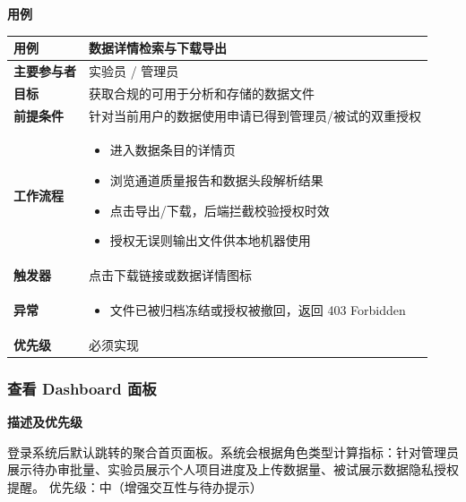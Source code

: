 \textbf{用例}
\begin{table}[H]
    \centering
    \begin{tabular}{|p{3cm}|p{11.5cm}|}
        \hline
        \textbf{用例} & 数据详情检索与下载导出 \\
        \hline
        \textbf{主要参与者} & 实验员 / 管理员 \\
        \hline
        \textbf{目标} & 获取合规的可用于分析和存储的数据文件 \\
        \hline
        \textbf{前提条件} & 针对当前用户的数据使用申请已得到管理员/被试的双重授权 \\
        \hline
        \textbf{工作流程} & 
        \vspace{-0.3cm}
        \begin{itemize}
            \item 进入数据条目的详情页
            \item 浏览通道质量报告和数据头段解析结果
            \item 点击导出/下载，后端拦截校验授权时效
            \item 授权无误则输出文件供本地机器使用
        \end{itemize} \vspace{-0.3cm} \\
        \hline
        \textbf{触发器} & 点击下载链接或数据详情图标 \\
        \hline
        \textbf{异常} &
        \vspace{-0.3cm}
        \begin{itemize}
            \item 文件已被归档冻结或授权被撤回，返回 403 Forbidden
        \end{itemize} \vspace{-0.3cm} \\
        \hline
        \textbf{优先级} & 必须实现 \\
        \hline
    \end{tabular}
\end{table}

\subsubsection{查看 Dashboard 面板}

\textbf{描述及优先级}

登录系统后默认跳转的聚合首页面板。系统会根据角色类型计算指标：针对管理员展示待办审批量、实验员展示个人项目进度及上传数据量、被试展示数据隐私授权提醒。
优先级：中（增强交互性与待办提示）

